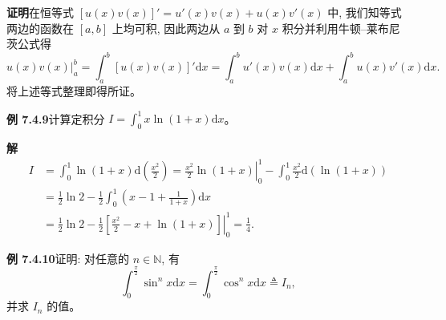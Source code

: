 \documentclass[UTF8,12pt,a4paper,fontset=fandol]{ctexart}
\begin{document}
\noindent\textbf{证明}\quad 在恒等式 $[u(x)v(x)]'=u'(x)v(x)+u(x)v'(x)$ 中, 我们知等式两边的函数在 $[a,b]$ 上均可积, 因此两边从 $a$ 到 $b$ 对 $x$ 积分并利用牛顿--莱布尼茨公式得
\[
  \left.u(x)v(x)\right|_a^b
  =\int_a^b [u(x)v(x)]'\mathrm dx
  =\int_a^b u'(x)v(x)\mathrm dx+\int_a^b u(x)v'(x)\mathrm dx.
\]
将上述等式整理即得所证。

\noindent\textbf{例 7.4.9}\quad 计算定积分 $I=\int_0^1 x\ln(1+x)\mathrm dx$。

\noindent\textbf{解}\quad
\[
\begin{aligned}
  I&=\int_0^1 \ln(1+x)\mathrm d\left(\frac{x^2}{2}\right)
  =\left.\frac{x^2}{2}\ln(1+x)\right|_0^1
  -\int_0^1 \frac{x^2}{2}\mathrm d(\ln(1+x))\\
  &=\frac{1}{2}\ln2-\frac{1}{2}\int_0^1\left(x-1+\frac{1}{1+x}\right)\mathrm dx\\
  &=\frac{1}{2}\ln2-\frac{1}{2}\left.\left[\frac{x^2}{2}-x+\ln(1+x)\right]\right|_0^1
  =\frac{1}{4}.
\end{aligned}
\]

\noindent\textbf{例 7.4.10}\quad 证明: 对任意的 $n\in\mathbb N$, 有
\[
  \int_0^{\frac{\pi}{2}}\sin^n x\mathrm dx
  =\int_0^{\frac{\pi}{2}}\cos^n x\mathrm dx\triangleq I_n,
\]
并求 $I_n$ 的值。
\end{document}
